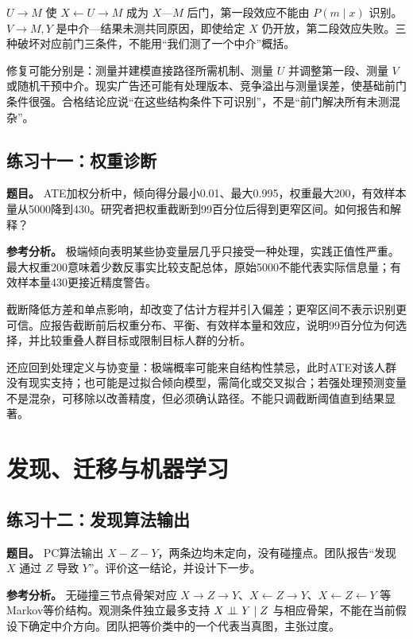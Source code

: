 $U\rightarrow M$ 使 $X\leftarrow U\rightarrow M$ 成为 $X$---$M$ 后门，第一段效应不能由 $P(m\mid x)$ 识别。$V\rightarrow M,Y$ 是中介---结果未测共同原因，即使给定 $X$ 仍开放，第二段效应失败。三种破坏对应前门三条件，不能用“我们测了一个中介”概括。

修复可能分别是：测量并建模直接路径所需机制、测量 $U$ 并调整第一段、测量 $V$ 或随机干预中介。现实广告还可能有处理版本、竞争溢出与测量误差，使基础前门条件很强。合格结论应说“在这些结构条件下可识别”，不是“前门解决所有未测混杂”。

\subsection*{练习十一：权重诊断}

\textbf{题目。} ATE加权分析中，倾向得分最小0.01、最大0.995，权重最大200，有效样本量从5000降到430。研究者把权重截断到99百分位后得到更窄区间。如何报告和解释？

\textbf{参考分析。} 极端倾向表明某些协变量层几乎只接受一种处理，实践正值性严重。最大权重200意味着少数反事实比较支配总体，原始5000不能代表实际信息量；有效样本量430更接近精度警告。

截断降低方差和单点影响，却改变了估计方程并引入偏差；更窄区间不表示识别更可信。应报告截断前后权重分布、平衡、有效样本量和效应，说明99百分位为何选择，并比较重叠人群目标或限制目标人群的分析。

还应回到处理定义与协变量：极端概率可能来自结构性禁忌，此时ATE对该人群没有现实支持；也可能是过拟合倾向模型，需简化或交叉拟合；若强处理预测变量不是混杂，可移除以改善精度，但必须确认路径。不能只调截断阈值直到结果显著。

\section{发现、迁移与机器学习}

\subsection*{练习十二：发现算法输出}

\textbf{题目。} PC算法输出 $X-Z-Y$，两条边均未定向，没有碰撞点。团队报告“发现 $X$ 通过 $Z$ 导致 $Y$”。评价这一结论，并设计下一步。

\textbf{参考分析。} 无碰撞三节点骨架对应 $X\rightarrow Z\rightarrow Y$、$X\leftarrow Z\rightarrow Y$、$X\leftarrow Z\leftarrow Y$ 等Markov等价结构。观测条件独立最多支持 $X\mathrel{\perp\!\!\!\perp} Y\mid Z$ 与相应骨架，不能在当前假设下确定中介方向。团队把等价类中的一个代表当真图，主张过度。

